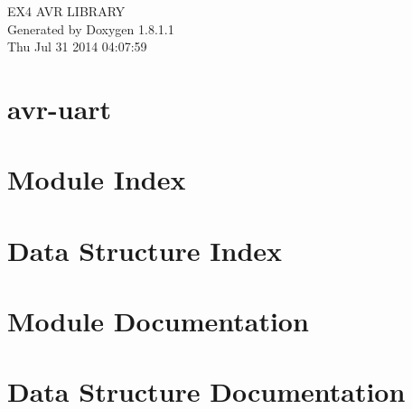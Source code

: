 \documentclass{book}
\begin{document}
\hypersetup{pageanchor=false,citecolor=blue}
\begin{titlepage}
\vspace*{7cm}
\begin{center}
{\Large E\-X4 A\-V\-R L\-I\-B\-R\-A\-R\-Y }\\
\vspace*{1cm}
{\large Generated by Doxygen 1.8.1.1}\\
\vspace*{0.5cm}
{\small Thu Jul 31 2014 04:07:59}\\
\end{center}
\end{titlepage}
\clearemptydoublepage
{}
\tableofcontents
\clearemptydoublepage
{}
\hypersetup{pageanchor=true,citecolor=blue}
\chapter{avr-\/uart}
\label{md_README}
\hypertarget{md_README}{}

\chapter{Module Index}

\chapter{Data Structure Index}

\chapter{Module Documentation}






\chapter{Data Structure Documentation}




\printindex
\end{document}

